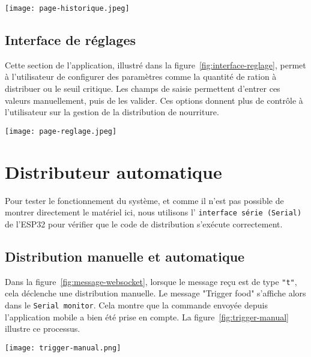 \begin{minipage}{\linewidth}
  \centering
  \texttt{[image: page-historique.jpeg]}
  \label{fig:interface-historique}
\end{minipage}

\subsection{Interface de réglages}
Cette section de l’application, illustré dans la figure~\ref{fig:interface-reglage}, permet à l’utilisateur de configurer des paramètres comme la quantité de ration à distribuer ou le seuil critique. Les champs de saisie permettent d’entrer ces valeurs manuellement, puis de les valider. Ces options donnent plus de contrôle à l'utilisateur sur la gestion de la distribution de nourriture.\\

\begin{minipage}{\linewidth}
  \centering
  \texttt{[image: page-reglage.jpeg]}
  \label{fig:interface-reglage}
\end{minipage}

\section{Distributeur automatique}

Pour tester le fonctionnement du système, et comme il n'est pas possible de montrer directement le matériel ici, nous utilisons l' \verb|interface série (Serial)| de l'ESP32 pour vérifier que le code de distribution s'exécute correctement.

\subsection{Distribution manuelle et automatique}

Dans la figure~\ref{fig:message-websocket}, lorsque le message reçu est de type \verb|"t"|, cela déclenche une distribution manuelle. Le message "Trigger food" s'affiche alors dans le \verb|Serial monitor|. Cela montre que la commande envoyée depuis l'application mobile a bien été prise en compte. La figure~\ref{fig:trigger-manual} illustre ce processus.\\

\begin{minipage}{\linewidth}
\centering
\texttt{[image: trigger-manual.png]}
\label{fig:trigger-manual}
\end{minipage} \\


